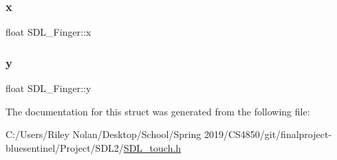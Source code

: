\mbox{\label{struct_s_d_l___finger_ab91dfbd03c3215560457fef44e1c7755}} 
\subsubsection{\texorpdfstring{x}{x}}
{\footnotesize\ttfamily float S\+D\+L\+\_\+\+Finger\+::x}

\mbox{\label{struct_s_d_l___finger_a0a2c7a06ae641940111e03801c672cf9}} 
\subsubsection{\texorpdfstring{y}{y}}
{\footnotesize\ttfamily float S\+D\+L\+\_\+\+Finger\+::y}



The documentation for this struct was generated from the following file\+:\begin{DoxyCompactItemize}
\item 
C\+:/\+Users/\+Riley Nolan/\+Desktop/\+School/\+Spring 2019/\+C\+S4850/git/finalproject-\/bluesentinel/\+Project/\+S\+D\+L2/\mbox{\hyperlink{_s_d_l__touch_8h}{S\+D\+L\+\_\+touch.\+h}}\end{DoxyCompactItemize}
